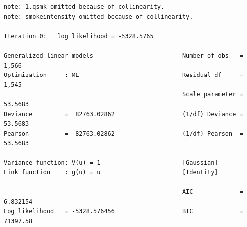 \documentclass[
  10pt,
  a4paper,
]{book}
\begin{document}
\begin{verbatim}
note: 1.qsmk omitted because of collinearity.
note: smokeintensity omitted because of collinearity.

Iteration 0:   log likelihood = -5328.5765  

Generalized linear models                         Number of obs   =      1,566
Optimization     : ML                             Residual df     =      1,545
                                                  Scale parameter =    53.5683
Deviance         =  82763.02862                   (1/df) Deviance =    53.5683
Pearson          =  82763.02862                   (1/df) Pearson  =    53.5683

Variance function: V(u) = 1                       [Gaussian]
Link function    : g(u) = u                       [Identity]

                                                  AIC             =   6.832154
Log likelihood   = -5328.576456                   BIC             =   71397.58


\end{verbatim}
\end{document}
